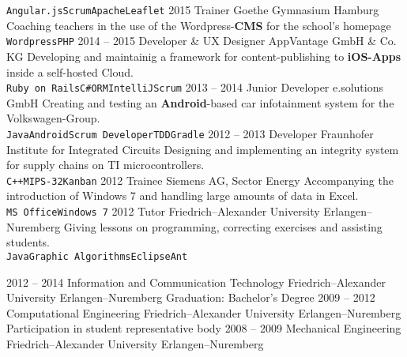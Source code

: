 \documentclass[9pt]{developercv} %
\begin{document}
\begin{entrylist}
{      \texttt{Angular.js}\slashsep\texttt{Scrum}\slashsep\texttt{Apache}\slashsep\texttt{Leaflet}
    }
  \entry
		{2015}
		{Trainer}
		{Goethe Gymnasium Hamburg}
		{
      Coaching teachers in the use of the Wordpress-\textbf{CMS} for the school's homepage\\
      \texttt{Wordpress}\slashsep\texttt{PHP}
    }
  \entry
		{2014 -- 2015}
		{Developer \& UX Designer}
		{AppVantage GmbH \& Co. KG}
		{
      Developing and maintainig a framework for content-publishing to \textbf{iOS-Apps} inside a self-hosted Cloud.\\
      \texttt{Ruby on Rails}\slashsep\texttt{C\#}\slashsep\texttt{ORM}\slashsep\texttt{IntelliJ}\slashsep\texttt{Scrum}
    }
  \entry
		{2013 -- 2014}
		{Junior Developer}
		{e.solutions GmbH}
		{
      Creating and testing an \textbf{Android}-based car infotainment system for the Volkswagen-Group.\\
      \texttt{Java}\slashsep\texttt{Android}\slashsep\texttt{Scrum Developer}\slashsep\texttt{TDD}\slashsep\texttt{Gradle}
    }
  \entry
		{2012 -- 2013}
		{Developer}
		{Fraunhofer Institute for Integrated Circuits}
		{
      Designing and implementing an integrity system for supply chains on TI microcontrollers.\\
      \texttt{C++}\slashsep\texttt{MIPS-32}\slashsep\texttt{Kanban}
    }
  \entry
 		{2012}
 		{Trainee}
 		{Siemens AG, Sector Energy}
 		{
      Accompanying the introduction of Windows 7 and handling large amounts of data in Excel.\\
      \texttt{MS Office}\slashsep\texttt{Windows 7}
    }
  \entry
 		{2012}
 		{Tutor}
 		{Friedrich–Alexander University Erlangen–Nuremberg}
 		{
      Giving lessons on programming, correcting exercises and assisting students.\\
      \texttt{Java}\slashsep\texttt{Graphic Algorithms}\slashsep\texttt{Eclipse}\slashsep\texttt{Ant}
    }
\end{entrylist}




\begin{entrylist}
	\entry
		{2012 -- 2014}
		{Information and Communication Technology}
		{Friedrich–Alexander University Erlangen–Nuremberg}
		{Graduation: Bachelor's Degree}
	\entry
		{2009 -- 2012}
		{Computational Engineering}
		{Friedrich–Alexander University Erlangen–Nuremberg}
		{Participation in student representative body}
	\entry
		{2008 -- 2009}
		{Mechanical Engineering}
		{Friedrich–Alexander University Erlangen–Nuremberg}
		{}
\end{entrylist}
\vspace{0.8cm}
\end{document}

